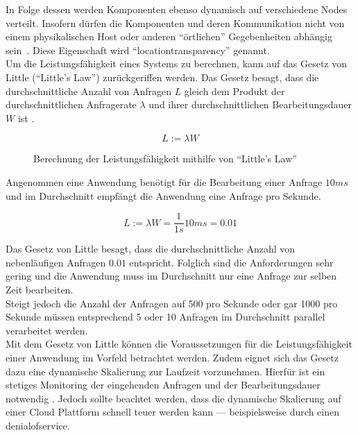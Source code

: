 In Folge dessen werden Komponenten ebenso dynamisch auf verschiedene Nodes verteilt. Insofern dürfen die Komponenten und deren Kommunikation nicht von einem physikalischen Host oder anderen \enquote{örtlichen} Gegebenheiten abhängig sein~\cite[S.~8]{vernon_reactive_2016}. Diese Eigenschaft wird \enquote{\gls{locationtransparency}} genannt.\\

Um die Leistungsfähigkeit eines Systems zu berechnen, kann auf das Gesetz von Little (\enquote{Little's Law}) zurückgeriffen werden. Das Gesetz besagt, dass die durchschnittliche Anzahl von Anfragen $L$ gleich dem Produkt der durchschnittlichen Anfragerate $\lambda$ und ihrer durchschnittlichen Bearbeitungsdauer $W$ ist \cite[S.~41]{kuhn_reactive_2015}.

\begin{figure}[H]
  \[L := \lambda W\]
  \caption{Berechnung der Leistungsfähigkeit mithilfe von \enquote{Little's Law}}
\end{figure}

Angenommen eine Anwendung benötigt für die Bearbeitung einer Anfrage $10ms$ und im Durchschnitt empfängt die Anwendung eine Anfrage pro Sekunde. 

\begin{figure}[H]
  \[L := \lambda W = \frac{1}{1s} 10ms = 0.01\]
\end{figure}

\vspace{-0.5cm}

Das Gesetz von Little besagt, dass die durchschnittliche Anzahl von nebenläufigen Anfragen $0.01$ entspricht. Folglich sind die Anforderungen sehr gering und die Anwendung muss im Durchschnitt nur eine Anfrage zur selben Zeit bearbeiten.\\
Steigt jedoch die Anzahl der Anfragen auf 500 pro Sekunde oder gar 1000 pro Sekunde müssen entsprechend 5 oder 10 Anfragen im Durchschnitt parallel verarbeitet werden.\\
Mit dem Gesetz von Little können die Voraussetzungen für die Leistungsfähigkeit einer Anwendung im Vorfeld betrachtet werden. Zudem eignet sich das Gesetz dazu eine dynamische Skalierung zur Laufzeit vorzunehmen. Hierfür ist ein stetiges Monitoring der eingehenden Anfragen und der Bearbeitungsdauer notwendig \cite[S.~42]{kuhn_reactive_2015}. Jedoch sollte beachtet werden, dass die dynamische Skalierung auf einer Cloud Plattform schnell teuer werden kann --- beispielsweise durch einen \gls{denialofservice}.

